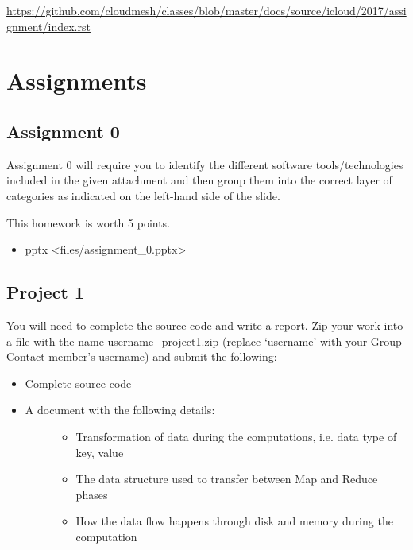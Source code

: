 \begin{fileremark}\url{https://github.com/cloudmesh/classes/blob/master/docs/source/icloud/2017/assignment/index.rst}\end{fileremark}
\section{Assignments}\label{assignments}

\subsection{Assignment 0}\label{assignment-0}

Assignment 0 will require you to identify the different software
tools/technologies included in the given attachment and then group them
into the correct layer of categories as indicated on the left-hand side
of the slide.

This homework is worth 5 points.

\begin{itemize}
\tightlist
\item
  pptx \textless{}files/assignment\_0.pptx\textgreater{}
\end{itemize}

\subsection{Project 1}\label{project-1}

You will need to complete the source code and write a report. Zip your
work into a file with the name username\_project1.zip (replace
`username' with your Group Contact member's username) and submit the
following:

\begin{itemize}
\item
  Complete source code
\item
  \begin{description}
  \item[A document with the following details:]
  \begin{itemize}
  \tightlist
  \item
    Transformation of data during the computations, i.e. data type of
    key, value
  \item
    The data structure used to transfer between Map and Reduce phases
  \item
    How the data flow happens through disk and memory during the
    computation
  \end{itemize}
  \end{description}
\end{itemize}

